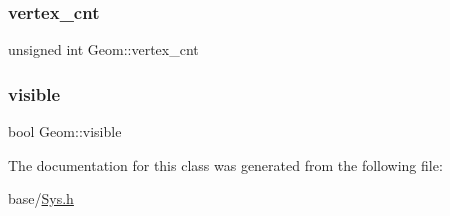 \subsubsection{\texorpdfstring{vertex\+\_\+cnt}{vertex\_cnt}}
{\footnotesize\ttfamily unsigned int Geom\+::vertex\+\_\+cnt}

\mbox{\label{classGeom_adc882cd899f86361652f9e09a9b3a24b}} 
\subsubsection{\texorpdfstring{visible}{visible}}
{\footnotesize\ttfamily bool Geom\+::visible}



The documentation for this class was generated from the following file\+:\begin{DoxyCompactItemize}
\item 
base/\mbox{\hyperlink{Sys_8h}{Sys.\+h}}\end{DoxyCompactItemize}
